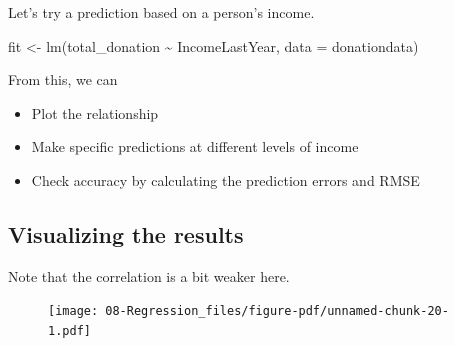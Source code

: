 \documentclass[
  letterpaper,
  DIV=11,
  numbers=noendperiod]{scrreprt}
\newenvironment{Shaded}{\begin{snugshade}}{\end{snugshade}}
\newcommand{\AttributeTok}[1]{\textcolor[rgb]{0.40,0.45,0.13}{#1}}
\newcommand{\DecValTok}[1]{\textcolor[rgb]{0.68,0.00,0.00}{#1}}
\newcommand{\FunctionTok}[1]{\textcolor[rgb]{0.28,0.35,0.67}{#1}}
\newcommand{\NormalTok}[1]{\textcolor[rgb]{0.00,0.23,0.31}{#1}}
\newcommand{\OtherTok}[1]{\textcolor[rgb]{0.00,0.23,0.31}{#1}}
\newcommand{\SpecialCharTok}[1]{\textcolor[rgb]{0.37,0.37,0.37}{#1}}
\newcommand{\StringTok}[1]{\textcolor[rgb]{0.13,0.47,0.30}{#1}}
\providecommand{\tightlist}{%
  \setlength{\itemsep}{0pt}\setlength{\parskip}{0pt}}\usepackage{longtable,booktabs,array}
\begin{document}
Let's try a prediction based on a person's income.

\begin{Shaded}
\begin{Highlighting}[]
\NormalTok{fit }\OtherTok{\textless{}{-}} \FunctionTok{lm}\NormalTok{(total\_donation }\SpecialCharTok{\textasciitilde{}}\NormalTok{ IncomeLastYear, }\AttributeTok{data =}\NormalTok{ donationdata)}
\end{Highlighting}
\end{Shaded}

From this, we can

\begin{itemize}
\tightlist
\item
  Plot the relationship
\item
  Make specific predictions at different levels of income
\item
  Check accuracy by calculating the prediction errors and RMSE
\end{itemize}

\hypertarget{visualizing-the-results-1}{%
\subsection{Visualizing the results}\label{visualizing-the-results-1}}

Note that the correlation is a bit weaker here.

\begin{Shaded}
\end{Shaded}

\begin{figure}[H]

{\centering \texttt{[image: 08-Regression\_files/figure-pdf/unnamed-chunk-20-1.pdf]}

}

\end{figure}
\end{document}
